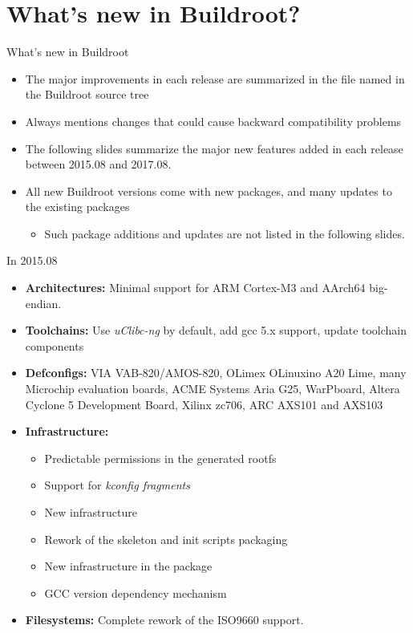 \section{What's new in Buildroot?}

\begin{frame}{What's new in Buildroot}
  \begin{itemize}
  \item The major improvements in each release are summarized in the
    file named  in the Buildroot source tree
  \item Always mentions changes that could cause backward
    compatibility problems
  \item The following slides summarize the major new features added in
    each release between 2015.08 and 2017.08.
  \item All new Buildroot versions come with new packages, and many
    updates to the existing packages
    \begin{itemize}
    \item Such package additions and updates are not listed in the
      following slides.
    \end{itemize}
  \end{itemize}
\end{frame}

\begin{frame}{In 2015.08}
  \begin{itemize}
  \item {\bf Architectures:} Minimal support for ARM Cortex-M3 and
    AArch64 big-endian.
  \item {\bf Toolchains:} Use {\em uClibc-ng} by default, add gcc 5.x
    support, update toolchain components
  \item {\bf Defconfigs:} VIA VAB-820/AMOS-820, OLimex OLinuxino A20
    Lime, many Microchip evaluation boards, ACME Systems Aria G25,
    WarPboard, Altera Cyclone 5 Development Board, Xilinx zc706, ARC
    AXS101 and AXS103
  \item {\bf Infrastructure:}
    \begin{itemize}
    \item Predictable permissions in the generated rootfs
    \item Support for {\em kconfig fragments}
    \item New  infrastructure
    \item Rework of the skeleton and init scripts packaging
    \item New  infrastructure in the 
      package
    \item GCC version dependency mechanism
    \end{itemize}
  \item {\bf Filesystems:} Complete rework of the ISO9660 support.
  \end{itemize}
\end{frame}

